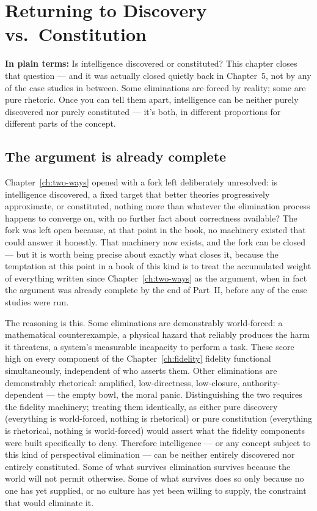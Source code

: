 \chapter{Returning to Discovery vs.\ Constitution}
\label{ch:resolving-fork}

\begin{plainlanguage}
\textbf{In plain terms:} Is intelligence discovered or constituted? This chapter closes that question — and it was actually closed quietly back in Chapter~5, not by any of the case studies in between. Some eliminations are forced by reality; some are pure rhetoric. Once you can tell them apart, intelligence can be neither purely discovered nor purely constituted — it's both, in different proportions for different parts of the concept.
\end{plainlanguage}

\section{The argument is already complete}

Chapter~\ref{ch:two-ways} opened with a fork left deliberately unresolved: is intelligence discovered, a fixed target that better theories progressively approximate, or constituted, nothing more than whatever the elimination process happens to converge on, with no further fact about correctness available? The fork was left open because, at that point in the book, no machinery existed that could answer it honestly. That machinery now exists, and the fork can be closed --- but it is worth being precise about exactly what closes it, because the temptation at this point in a book of this kind is to treat the accumulated weight of everything written since Chapter~\ref{ch:two-ways} as the argument, when in fact the argument was already complete by the end of Part~II, before any of the case studies were run.

The reasoning is this. Some eliminations are demonstrably world-forced: a mathematical counterexample, a physical hazard that reliably produces the harm it threatens, a system's measurable incapacity to perform a task. These score high on every component of the Chapter~\ref{ch:fidelity} fidelity functional simultaneously, independent of who asserts them. Other eliminations are demonstrably rhetorical: amplified, low-directness, low-closure, authority-dependent --- the empty bowl, the moral panic. Distinguishing the two requires the fidelity machinery; treating them identically, as either pure discovery (everything is world-forced, nothing is rhetorical) or pure constitution (everything is rhetorical, nothing is world-forced) would assert what the fidelity components were built specifically to deny. Therefore intelligence --- or any concept subject to this kind of perspectival elimination --- can be neither entirely discovered nor entirely constituted. Some of what survives elimination survives because the world will not permit otherwise. Some of what survives does so only because no one has yet supplied, or no culture has yet been willing to supply, the constraint that would eliminate it.


